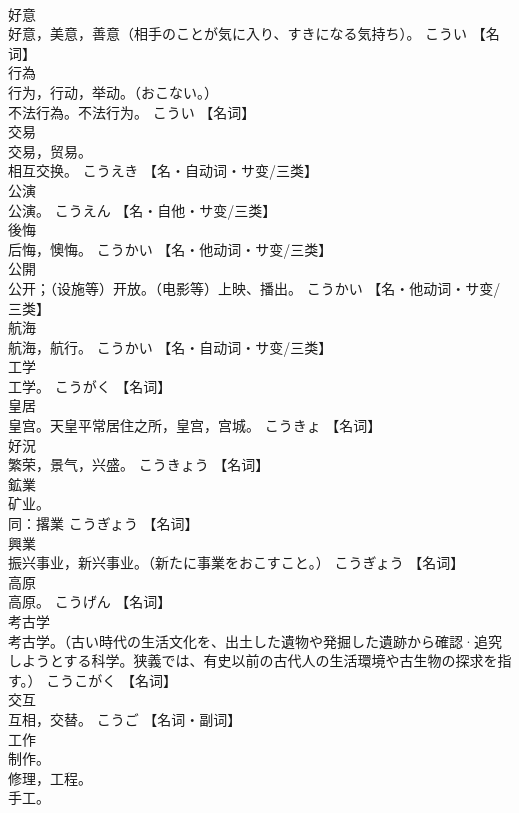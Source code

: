 \documentclass[8pt]{extreport}
\begin{document}
\begin{CJK}{UTF8}{min}
\\	好意	
\\	好意，美意，善意（相手のことが気に入り、すきになる気持ち）。	こうい		【名词】
\\	行為	
\\	行为，行动，举动。（おこない。） 
\\	不法行為。不法行为。	こうい		【名词】
\\	交易	
\\	交易，贸易。 
\\	相互交换。	こうえき		【名・自动词・サ变/三类】
\\	公演	
\\	公演。	こうえん		【名・自他・サ变/三类】
\\	後悔	
\\	后悔，懊悔。	こうかい		【名・他动词・サ变/三类】
\\	公開	
\\	公开；（设施等）开放。（电影等）上映、播出。	こうかい		【名・他动词・サ变/三类】
\\	航海	
\\	航海，航行。	こうかい		【名・自动词・サ变/三类】
\\	工学	
\\	工学。	こうがく		【名词】
\\	皇居	
\\	皇宫。天皇平常居住之所，皇宫，宫城。	こうきょ		【名词】
\\	好況	
\\	繁荣，景气，兴盛。	こうきょう		【名词】
\\	鉱業	
\\	矿业。 
\\	同：撂業	こうぎょう		【名词】
\\	興業	
\\	振兴事业，新兴事业。（新たに事業をおこすこと。）	こうぎょう		【名词】
\\	高原	
\\	高原。	こうげん		【名词】
\\	考古学	
\\	考古学。（古い時代の生活文化を、出土した遺物や発掘した遺跡から確認·追究しようとする科学。狭義では、有史以前の古代人の生活環境や古生物の探求を指す。）	こうこがく		【名词】
\\	交互	
\\	互相，交替。	こうご		【名词・副词】
\\	工作	
\\	制作。 
\\	修理，工程。 
\\	手工。 

\end{CJK}
\end{document}
